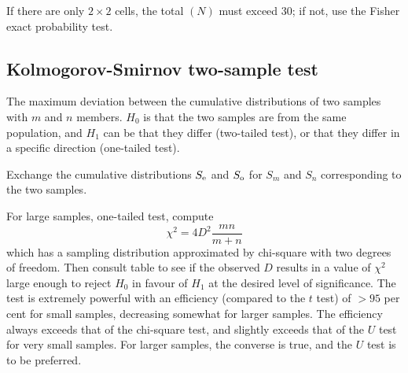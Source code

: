 \documentclass[12pt,a4paper]{article}
\begin{document}
If there are only $2 \times 2$ cells, the total $(N)$ must exceed 30; if not, use the Fisher exact probability test.

\subsection{Kolmogorov-Smirnov two-sample test}
The maximum deviation between the cumulative distributions of two samples with $m$ and $n$ members. $H_0$ is that the two samples are from the same population, and $H_1$ can be that they differ (two-tailed test), or that they differ in a specific direction (one-tailed test).

Exchange the cumulative distributions $S_{\rm e}$ and $S_{\rm o}$ for $S_m$ and $S_n$ corresponding to the two samples. 

For large samples, one-tailed test, compute
\begin{equation}
\chi^2 = 4 D^2 \frac{mn}{m+n}
\end{equation}
which has a sampling distribution approximated by chi-square with two degrees of freedom. Then consult table to see if the observed $D$ results in a value of $\chi^2$ large enough to reject $H_0$ in favour of $H_1$ at the
desired level of significance. The test is extremely powerful with an efficiency (compared to the $t$ test) of $> 95$ per cent for small samples, decreasing somewhat for larger samples. The efficiency always exceeds that of the chi-square test, and slightly exceeds that of the $U$ test for very small samples. For larger samples, the converse is true, and the $U$ test is to be preferred.
\end{document}
